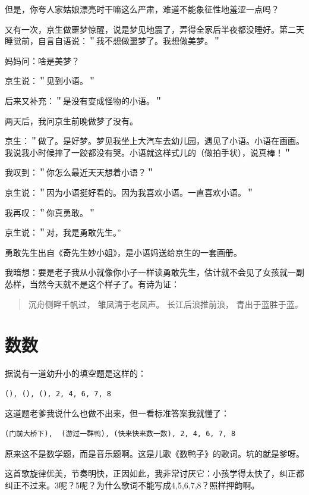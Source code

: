 \documentclass[twoside,openright,headings=optiontohead]{ctexbook} %
\begin{document}
{但是，你夸人家姑娘漂亮时干嘛这么严肃，难道不能象征性地羞涩一点吗？

又有一次，京生做噩梦惊醒，说是梦见地震了，弄得全家后半夜都没睡好。第二天睡觉前，自言自语说：＂我不想做噩梦了。我想做美梦。＂

妈妈问：啥是美梦？

京生说：＂见到小语。＂

后来又补充：＂是没有变成怪物的小语。＂

两天后，我问京生前晚做梦了没有。

京生：＂做了。是好梦。梦见我坐上大汽车去幼儿园，遇见了小语。小语在画画。我说我小时候摔了一跤都没有哭。小语就这样式儿的（做拍手状），说真棒！＂

我叹到：＂你怎么最近天天想着小语？＂

京生说：＂因为小语挺好看的。因为我喜欢小语。一直喜欢小语。＂

我再叹：＂你真勇敢。＂

京生说：＂对，我是勇敢先生。''

勇敢先生出自《奇先生妙小姐》，是小语妈送给京生的一套画册。

我暗想：要是老子我从小就像你小子一样读勇敢先生，估计就不会见了女孩就一副怂样，当然今天就不是这个样子了。有诗为证：

\begin{quote}
沉舟侧畔千帆过， 雏凤清于老凤声。 长江后浪推前浪， 青出于蓝胜于蓝。
\end{quote}

\chapter*{数数}\label{counting}

据说有一道幼升小的填空题是这样的：

\begin{verbatim}
(), (), (), 2, 4, 6, 7, 8
\end{verbatim}

这道题老爹我说什么也做不出来，但一看标准答案我就懂了：

\begin{verbatim}
(门前大桥下),  (游过一群鸭), (快来快来数一数), 2, 4, 6, 7, 8
\end{verbatim}

原来这不是数学题，而是音乐题啊。这是儿歌《数鸭子》的歌词。坑的就是爹呀。

这首歌旋律优美，节奏明快，正因如此，我非常讨厌它：小孩学得太快了，纠正都纠正不过来。3呢？5呢？为什么歌词不能写成4,5,6,7,8？照样押韵啊。

}
\end{document}
